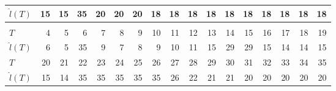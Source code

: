 \documentclass[12pt,a4paper]{article}
\begin{document}
\begin{landscape}
\begin{table}[htbp]
\begin{tabular*}{\linewidth}{@{\extracolsep{\fill}}lrrrrrrrrrrrrrrrr}
			$\hat{l}(T)$ & 15 & 15 & 35 & 20 & 20 & 20 & 18 & 18 & 18 & 18 & 18 & 18 & 18 & 18 & 18 & 18 \\
			\midrule\addlinespace[2.5pt]
			\multicolumn{17}{c}{\textbf{$\tau=0.95,\ T_{\mathrm{stab}}=28,\ \varepsilon=3$}} \\
			\addlinespace[2.5pt]
			\midrule
			$T$ & 4 & 5 & 6 & 7 & 8 & 9 & 10 & 11 & 12 & 13 & 14 & 15 & 16 & 17 & 18 & 19 \\
			$\hat{l}(T)$ & 6 & 5 & 35 & 9 & 7 & 8 & 9 & 10 & 11 & 15 & 29 & 29 & 15 & 14 & 14 & 15 \\
			$T$ & 20 & 21 & 22 & 23 & 24 & 25 & 26 & 27 & 28 & 29 & 30 & 31 & 32 & 33 & 34 & 35 \\
			$\hat{l}(T)$ & 15 & 14 & 35 & 35 & 35 & 35 & 35 & 26 & 22 & 21 & 21 & 20 & 20 & 20 & 20 & 20 \\
			\bottomrule
		\end{tabular*}
	\end{table}
\end{landscape}
\end{document}
